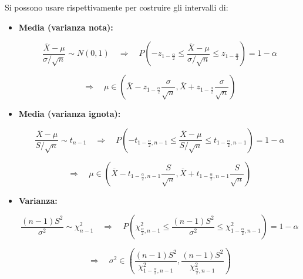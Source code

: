 \documentclass{article}
\begin{document}
Si possono usare rispettivamente per costruire gli intervalli di:
\begin{itemize}

    \item \textbf{Media (varianza nota):}
    
    \[
    \frac{\overline{X}-\mu}{\sigma/\sqrt{n}}\sim N(0,1)
    \quad\Longrightarrow\quad
    P\left(-z_{1-\frac{\alpha}{2}}\leq
    \frac{\overline{X}-\mu}{\sigma/\sqrt{n}}
    \leq z_{1-\frac{\alpha}{2}}\right)=1-\alpha
    \]
    
    \[
    \Longrightarrow\quad
    \mu\in
    \left(
    \overline{X}-z_{1-\frac{\alpha}{2}}\frac{\sigma}{\sqrt n},
    \overline{X}+z_{1-\frac{\alpha}{2}}\frac{\sigma}{\sqrt n}
    \right)
    \]

    \item \textbf{Media (varianza ignota):}
    
    \[
    \frac{\overline{X}-\mu}{S/\sqrt{n}}\sim t_{n-1}
    \quad\Longrightarrow\quad
    P\left(-t_{1-\frac{\alpha}{2},n-1}\leq
    \frac{\overline{X}-\mu}{S/\sqrt{n}}
    \leq t_{1-\frac{\alpha}{2},n-1}\right)=1-\alpha
    \]
    
    \[
    \Longrightarrow\quad
    \mu\in
    \left(
    \overline{X}-t_{1-\frac{\alpha}{2},n-1}\frac{S}{\sqrt n},
    \overline{X}+t_{1-\frac{\alpha}{2},n-1}\frac{S}{\sqrt n}
    \right)
    \]

    \item \textbf{Varianza:}
    
    \[
    \frac{(n-1)S^2}{\sigma^2}\sim\chi^2_{n-1}
    \quad\Longrightarrow\quad
    P\left(
    \chi^2_{\frac{\alpha}{2},n-1}
    \leq
    \frac{(n-1)S^2}{\sigma^2}
    \leq
    \chi^2_{1-\frac{\alpha}{2},n-1}
    \right)=1-\alpha
    \]
    
    \[
    \Longrightarrow\quad
    \sigma^2\in
    \left(
    \frac{(n-1)S^2}{\chi^2_{1-\frac{\alpha}{2},n-1}},
    \frac{(n-1)S^2}{\chi^2_{\frac{\alpha}{2},n-1}}
    \right)
    \]\newline

\end{itemize}
\end{document}
